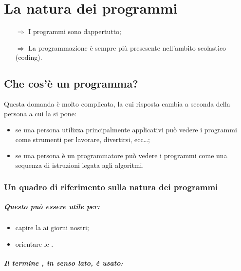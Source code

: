 \chapter{La natura dei programmi}

\begin{itemize}
    \item [$\Rightarrow$] I programmi sono dappertutto;
    \item [$\Rightarrow$] La programmazione è sempre più presesente nell'ambito scolastico (coding).
\end{itemize}

\section{Che cos'è un programma?}

Questa domanda è molto complicata, la cui risposta cambia a seconda 
della persona a cui la si pone:
\begin{itemize}
    \item se una persona utilizza principalmente applicativi può vedere
    i programmi come strumenti per lavorare, divertirsi, ecc\dots;
    \item se una persona è un programmatore può vedere i programmi come
    una sequenza di istruzioni legata agli algoritmi.
\end{itemize}


\subsection{Un quadro di riferimento sulla natura dei programmi}

\paragraph{Questo  può essere utile per:}

\begin{itemize}
    \item capire la  ai giorni nostri;
    \item orientare le .
\end{itemize}

\paragraph{Il termine , in senso lato, è usato:}

